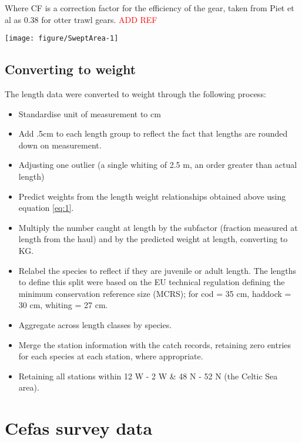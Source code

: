 \documentclass[12pt]{article}\usepackage[]{graphicx}\usepackage[]{color}
\makeatletter
\def\maxwidth{ %
  \ifdim\Gin@nat@width>\linewidth
    \linewidth
  \else
    \Gin@nat@width
  \fi
}
\newenvironment{knitrout}{}{} %
\makeatother
\begin{document}
Where CF is a correction factor for the efficiency of the gear, taken from Piet
et al as 0.38 for otter trawl gears. \textcolor{red}{ADD REF}

\begin{knitrout}\footnotesize
{}\color{fgcolor}

{\centering \texttt{[image: figure/SweptArea-1]} 

}



\end{knitrout}

\subsection{Converting to weight}

The length data were converted to weight through the following process:

\begin{itemize}
	\item Standardise unit of measurement to cm
	\item Add .5cm to each length group to reflect the fact that lengths
		are rounded down on measurement.
	\item Adjusting one outlier (a single whiting of 2.5 m, an order
		greater than actual length) 
	\item Predict weights from the length weight relationships obtained
		above using equation \ref{eq:1}.
	\item Multiply the number caught at length by the subfactor (fraction
		measured at length from the haul) and by the predicted weight
		at length, converting to KG.
	\item Relabel the species to reflect if they are juvenile or adult
		length. The lengths to define this split were based on the EU
		technical regulation defining the minimum conservation
		reference size (MCRS); for cod = 35 cm, haddock = 30 cm,
		whiting = 27 cm.
	\item Aggregate across length classes by species.
	\item Merge the station information with the catch records, retaining
		zero entries for each species at each station, where
		appropriate.
	\item Retaining all stations within 12 W - 2 W \&  48 N - 52 N (the
		Celtic Sea area).
\end{itemize}

\section{Cefas survey data}
\end{document}
